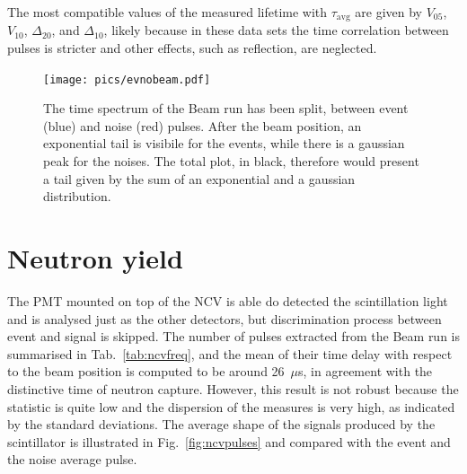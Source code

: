  The most compatible values of the measured lifetime with $\tau_{\mathrm{avg}}$ are given by $V_{05}$, $V_{10}$, %
 $\Delta_{20}$, and $\Delta_{10}$, likely because in these data sets the time correlation between pulses is %
 stricter and other effects, such as reflection, are neglected.

 \begin{figure}[]
   \centering
   \texttt{[image: pics/evnobeam.pdf]}
   \caption{The time spectrum of the Beam run has been split, between event (blue) and noise (red) pulses.
     After the beam position, an exponential tail is visibile for the events, while there is a gaussian peak for %
     the noises.
     The total plot, in black, therefore would present a tail given by the sum of an exponential and %
     a gaussian distribution.}
   \label{fig:beamtail}
 \end{figure}


\section{Neutron yield}
\label{sec:neutron}
 
 The PMT mounted on top of the NCV is able do detected the scintillation light and is analysed just as %
 the other detectors, but discrimination process between event and signal is skipped.
 The number of pulses extracted from the Beam run is summarised in Tab.~\ref{tab:ncvfreq}, and the mean %
 of their time delay with respect to the beam position is computed to be around 26~$\mu$s, in %
 agreement with the distinctive time of neutron capture.
 However, this result is not robust because the statistic is quite low and the dispersion of the measures %
 is very high, as indicated by the standard deviations.
 The average shape of the signals produced by the scintillator is illustrated in Fig.~\ref{fig:ncvpulses} and %
 compared with the event and the noise average pulse.

